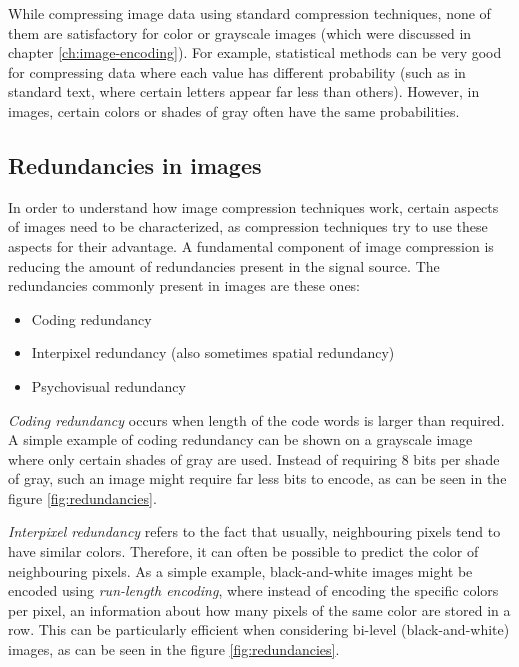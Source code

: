 \documentclass[thesis=M,english]{FITthesis}[2012/10/20]
\begin{document}
While compressing image data using standard compression techniques, none of them
are satisfactory for color or grayscale images (which were discussed in chapter
\ref{ch:image-encoding}). For example, statistical methods can be very good for
compressing data where each value has different probability (such as in standard
text, where certain letters appear far less than others). However, in images, certain
colors or shades of gray often have the same probabilities.\cite{datacompressioncompleteref}

\subsection{Redundancies in images}
\label{sec:imgcmpr-redund}
In order to understand how image compression techniques work, certain aspects of
images need to be characterized, as compression techniques try to use these
aspects for their advantage. A fundamental component of image compression is
reducing the amount of redundancies present in the signal source. The redundancies
commonly present in images are these ones:

\begin{itemize}
  \item Coding redundancy
  \item Interpixel redundancy (also sometimes spatial redundancy)
  \item Psychovisual redundancy
\end{itemize}
\cite{fromdcttowavelet}

\emph{Coding redundancy} occurs when length of the code words is larger than
required. A simple example of coding redundancy can be shown on a grayscale
image where only certain shades of gray are used. Instead of requiring
8 bits per shade of gray, such an image might require far less bits to
encode, as can be seen in the figure \ref{fig:redundancies}.

\emph{Interpixel redundancy} refers to the fact that usually, neighbouring pixels
tend to have similar colors. Therefore, it can often be possible to predict
the color of neighbouring pixels. As a simple example, black-and-white images
might be encoded using \emph{run-length encoding}, where instead of 
encoding the specific colors per pixel, an information about how many
pixels of the same color are stored in a row. This can be particularly
efficient when considering bi-level (black-and-white) images, as can be seen
in the figure \ref{fig:redundancies}.
\end{document}
